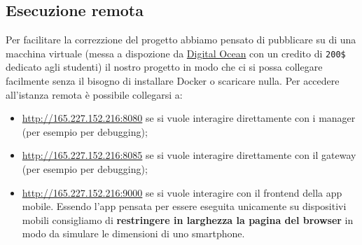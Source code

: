 \subsection{Esecuzione remota}
Per facilitare la correzzione del progetto abbiamo pensato di pubblicare su di una macchina virtuale (messa a dispozione da \href{https://www.digitalocean.com}{Digital Ocean} con un credito di \verb|200$| dedicato agli studenti) il nostro progetto in modo che ci si possa collegare facilmente senza il bisogno di installare Docker o scaricare nulla. Per accedere all'istanza remota è possibile collegarsi a:
\begin{itemize}
  \item \href{http://165.227.152.216:8080}{http://165.227.152.216:8080} se si vuole interagire direttamente con i manager (per esempio per debugging);
  \item \href{http://165.227.152.216:8085}{http://165.227.152.216:8085} se si vuole interagire direttamente con il gateway (per esempio per debugging);
  \item \href{http://165.227.152.216:9000}{http://165.227.152.216:9000} se si vuole interagire con il frontend della app mobile. Essendo l'app pensata per essere eseguita unicamente su dispositivi mobili consigliamo di \textbf{restringere in larghezza la pagina del browser} in modo da simulare le dimensioni di uno smartphone.
\end{itemize}



